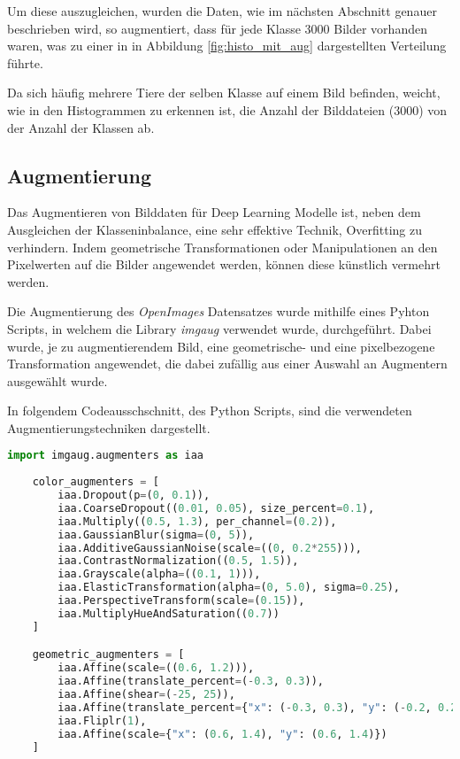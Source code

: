 Um diese auszugleichen, wurden die Daten, wie im nächsten
Abschnitt genauer beschrieben wird, so augmentiert, 
dass für jede Klasse 3000 Bilder vorhanden waren, was zu einer in 
in Abbildung \ref{fig:histo_mit_aug} 
dargestellten Verteilung führte.

Da sich häufig mehrere Tiere der selben Klasse 
auf einem Bild befinden, weicht, wie in den Histogrammen 
zu erkennen ist, die Anzahl der Bilddateien (3000) von 
der Anzahl der Klassen ab.



\subsection{Augmentierung}\label{subsec:augmentation}

Das Augmentieren von Bilddaten für Deep Learning Modelle
ist, neben dem Ausgleichen der Klasseninbalance, eine sehr
effektive Technik, Overfitting zu verhindern.
Indem geometrische Transformationen oder Manipulationen 
an den Pixelwerten auf die Bilder angewendet werden, 
können diese künstlich vermehrt werden.

Die Augmentierung des \textit{OpenImages} Datensatzes wurde mithilfe 
eines Pyhton Scripts, in welchem die Library 
\textit{imgaug} \cite{imgaug} verwendet wurde, durchgeführt.
Dabei wurde, je zu augmentierendem Bild, eine geometrische- und 
eine pixelbezogene Transformation angewendet, die dabei 
zufällig aus einer Auswahl an Augmentern ausgewählt wurde.

In folgendem Codeausschschnitt, des Python Scripts, sind die 
verwendeten Augmentierungstechniken dargestellt.

\begin{lstlisting}[language=Python]
    import imgaug.augmenters as iaa
    
    color_augmenters = [
        iaa.Dropout(p=(0, 0.1)),
        iaa.CoarseDropout((0.01, 0.05), size_percent=0.1),
        iaa.Multiply((0.5, 1.3), per_channel=(0.2)),
        iaa.GaussianBlur(sigma=(0, 5)),
        iaa.AdditiveGaussianNoise(scale=((0, 0.2*255))),
        iaa.ContrastNormalization((0.5, 1.5)),
        iaa.Grayscale(alpha=((0.1, 1))),
        iaa.ElasticTransformation(alpha=(0, 5.0), sigma=0.25),
        iaa.PerspectiveTransform(scale=(0.15)),
        iaa.MultiplyHueAndSaturation((0.7))
    ]

    geometric_augmenters = [
        iaa.Affine(scale=((0.6, 1.2))),
        iaa.Affine(translate_percent=(-0.3, 0.3)),
        iaa.Affine(shear=(-25, 25)),
        iaa.Affine(translate_percent={"x": (-0.3, 0.3), "y": (-0.2, 0.2)}),
        iaa.Fliplr(1),
        iaa.Affine(scale={"x": (0.6, 1.4), "y": (0.6, 1.4)})
    ]
    
\end{lstlisting}

